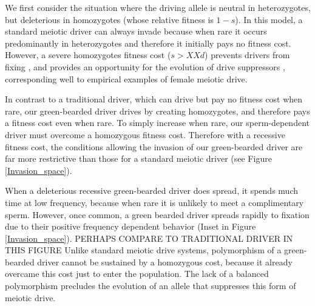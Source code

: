\documentclass[12pt,letterpaper]{article}
\begin{document}
We first consider the situation where the driving allele is neutral in heterozygotes, 
	but deleterious in homozygotes (whose relative fitness is $1-s$).  
In this model, a standard meiotic driver can always invade because 
	when rare it occurs predominantly in heterozygotes and therefore it initially pays no fitness cost. 
However, a severe homozygotes fitness cost ($s>XXd$) prevents  
	drivers from fixing  \citep{Prout1973}, 
	and provides an opportunity for the
	evolution of drive suppressors  \citep{XX}, corresponding well to 
	empirical examples of female meiotic drive. 




In contrast to a traditional driver, which can drive but pay no fitness cost when rare, 
	our green-bearded driver drives by creating homozygotes, and therefore pays a fitness cost even when rare. 
To simply increase when rare, our sperm-dependent driver must overcome a homozygous fitness cost.
Therefore with a recessive fitness cost,
	the conditions allowing the invasion of our green-bearded driver 
 	are far more restrictive than those for a standard meiotic driver (see Figure \ref{Invasion_space}).


When a deleterious recessive green-bearded driver does spread, 
	it spends much time at low frequency, because when rare it is unlikely to meet a complimentary sperm. 
However, once common, a green bearded driver spreads rapidly to fixation due to their
	positive frequency dependent behavior (Inset in Figure \ref{Invasion_space}).  PERHAPS COMPARE TO TRADITIONAL DRIVER IN THIS FIGURE
Unlike standard meiotic drive systems, polymorphism of a green-bearded driver cannot be sustained by a homozygous cost, 
	because it already overcame this cost just to enter the population.
The lack of a balanced polymorphism precludes the evolution of an allele that suppresses this form of meiotic drive.
\end{document}
